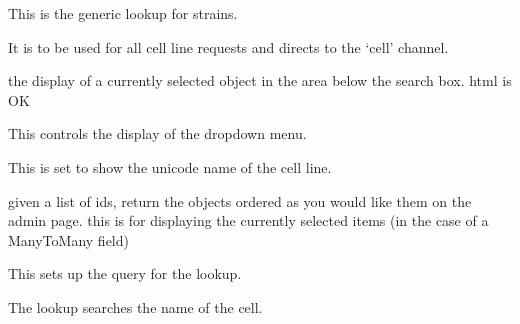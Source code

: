 \documentclass[letterpaper,10pt,english]{sphinxmanual}
\begin{document}

\begin{fulllineitems}
\label{api:experimentdb.reagents.lookups.CellLineLookup}
This is the generic lookup for strains.


It is to be used for all cell line requests and directs to the `cell' channel.


\begin{fulllineitems}
\label{api:experimentdb.reagents.lookups.CellLineLookup.format_item}
the display of a currently selected object in the area below the search box. html is OK


\end{fulllineitems}


\begin{fulllineitems}
\label{api:experimentdb.reagents.lookups.CellLineLookup.format_result}
This controls the display of the dropdown menu.


This is set to show the unicode name of the cell line.


\end{fulllineitems}


\begin{fulllineitems}
\label{api:experimentdb.reagents.lookups.CellLineLookup.get_objects}
given a list of ids, return the objects ordered as you would like them on the admin page.
this is for displaying the currently selected items (in the case of a ManyToMany field)


\end{fulllineitems}


\begin{fulllineitems}
\label{api:experimentdb.reagents.lookups.CellLineLookup.get_query}
This sets up the query for the lookup.


The lookup searches the name of the cell.


\end{fulllineitems}


\end{fulllineitems}
\end{document}
